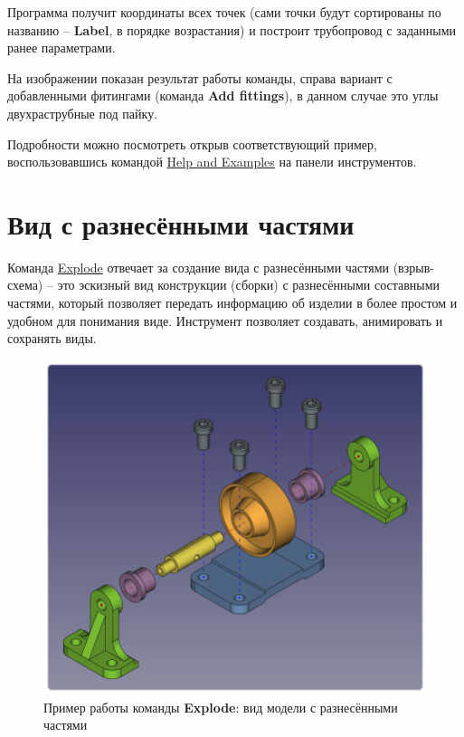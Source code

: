 \documentclass[a4paper,12pt]{article}
\begin{document}
Программа получит координаты всех точек (сами точки будут сортированы по названию -- \textbf{Label}, в порядке возрастания) и построит трубопровод с заданными ранее параметрами.

На изображении показан результат работы команды, справа вариант с добавленными фитингами (команда \textbf{Add fittings}), в данном случае это углы двухраструбные под пайку.

Подробности можно посмотреть открыв соответствующий пример, воспользовавшись командой \hyperref[sec:9]{Help and Examples} на панели инструментов.

\pagebreak




\section{Вид с разнесёнными частями}

Команда \hyperref[sec:7]{Explode} отвечает за создание вида с разнесёнными частями (взрыв-схема) -- это эскизный вид конструкции (сборки) с разнесёнными составными частями, который позволяет передать информацию об изделии в более простом и удобном для понимания виде. Инструмент позволяет создавать, анимировать и сохранять виды.

\begin{figure}[htp]
	\centering
	\includegraphics[scale=0.42]{img/exploded_m_result.png}
	\caption{Пример работы команды \textbf{Explode}: вид модели с разнесёнными частями}
	\label{sec:exploded_m_result}
\end{figure}
\end{document}
